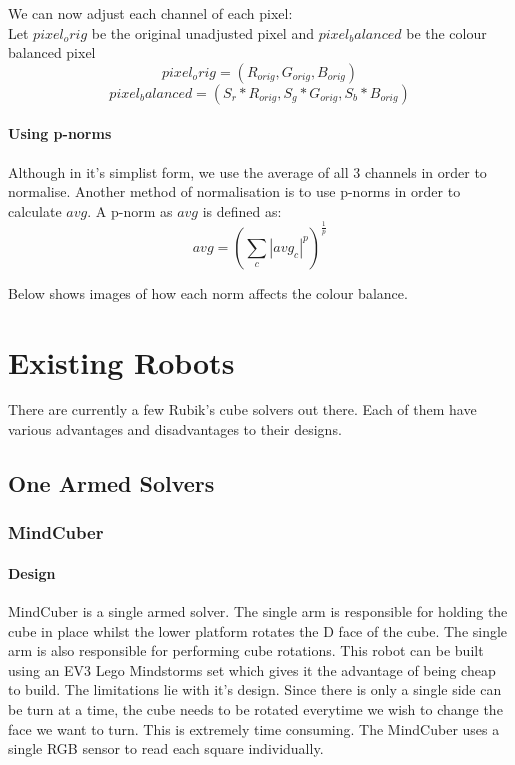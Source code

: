 \documentclass[titlepage]{report}[12pt]
\begin{document}
We can now adjust each channel of each pixel:
\\
Let \begin{math}pixel_orig\end{math} be the original unadjusted pixel and \begin{math} pixel_balanced\end{math} be the colour balanced pixel
\begin{equation}
pixel_orig = (R_{orig}, G_{orig}, B_{orig})
\end{equation}
\begin{equation}
pixel_balanced = (S_r * R_{orig}, S_g*G_{orig},S_b*B_{orig})
\end{equation}

\paragraph{Using p-norms}
Although in it's simplist form, we use the average of all 3 channels in order to normalise. Another method of normalisation is to use p-norms in order to calculate \begin{math}avg\end{math}. A p-norm as \begin{math} avg \end{math} is defined as:
\begin{equation}
avg = (\sum_c |avg_c| ^ p)^\frac{1}{p}
\end{equation}


Below shows images of how each norm affects the colour balance.

\section{Existing Robots}
There are currently a few Rubik's cube solvers out there. Each of them have various advantages and disadvantages to their designs.

\subsection{One Armed Solvers}
\subsubsection{MindCuber}
\paragraph{Design}
MindCuber is a single armed solver. The single arm is responsible for holding the cube in place whilst the lower platform rotates the D face of the cube. The single arm is also responsible for performing cube rotations. This robot can be built using an EV3 Lego Mindstorms set which gives it the advantage of being cheap to build. The limitations lie with it's design. Since there is only a single side can be turn at a time, the cube needs to be rotated everytime we wish to change the face we want to turn. This is extremely time consuming. The MindCuber uses a single RGB sensor to read each square individually.
\end{document}

